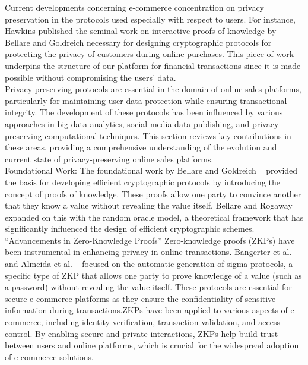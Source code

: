 \documentclass[12pt]{article}
\begin{document}
Current developments concerning e-commerce concentration on privacy preservation in the protocols used especially with respect to users. For instance, Hawkins published the seminal work on interactive proofs of knowledge by Bellare and Goldreich necessary for designing cryptographic protocols for protecting the privacy of customers during online purchases. This piece of work underpins the structure of our platform for financial transactions since it is made possible without compromising the users’ data.\\

Privacy-preserving protocols are essential in the domain of online sales platforms, particularly for maintaining user data protection while ensuring transactional integrity. The development of these protocols has been influenced by various approaches in big data analytics, social media data publishing, and privacy-preserving computational techniques. This section reviews key contributions in these areas, providing a comprehensive understanding of the evolution and current state of privacy-preserving online sales platforms.\\

Foundational Work: The foundational work by Bellare and Goldreich ~\cite{Bellare1992} provided the basis for developing efficient cryptographic protocols by introducing the concept of proofs of knowledge. These proofs allow one party to convince another that they know a value without revealing the value itself. Bellare and Rogaway ~\cite{Bellare1993} expanded on this with the random oracle model, a theoretical framework that has significantly influenced the design of efficient cryptographic schemes. \\

“Advancements in Zero-Knowledge Proofs” Zero-knowledge proofs (ZKPs) have been instrumental in enhancing privacy in online transactions. Bangerter et al.~\cite{Bangerter2009} and Almeida et al. ~\cite{Almeida2010} focused on the automatic generation of sigma-protocols, a specific type of ZKP that allows one party to prove knowledge of a value (such as a password) without revealing the value itself. These protocols are essential for secure e-commerce platforms as they ensure the confidentiality of sensitive information during transactions.ZKPs have been applied to various aspects of e-commerce, including identity verification, transaction validation, and access control. By enabling secure and private interactions, ZKPs help build trust between users and online platforms, which is crucial for the widespread adoption of e-commerce solutions.\\
\end{document}
